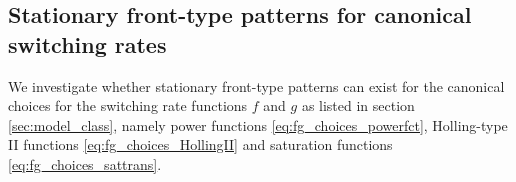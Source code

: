\documentclass[a4paper,10pt,abstract=true,parskip=true]{scrartcl}
\theoremstyle{remark}
\numberwithin{equation}{section}
\numberwithin{thm}{section}
\begin{document}
 \subsection{Stationary front-type patterns for canonical switching rates}
 We investigate whether stationary front-type patterns can exist for the canonical choices for the switching rate functions $f$ and $g$ as listed in section \ref{sec:model_class}, namely power functions \eqref{eq:fg_choices_powerfct}, Holling-type II functions \eqref{eq:fg_choices_HollingII} and saturation functions \eqref{eq:fg_choices_sattrans}.
\end{document}
